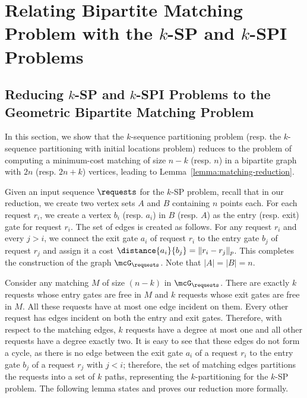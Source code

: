 \section{Relating Bipartite Matching Problem with the \texorpdfstring{$k$}{-}-SP and \texorpdfstring{$k$}{-}-SPI Problems}

\subsection{Reducing \texorpdfstring{$k$}{}-SP and \texorpdfstring{$k$}{}-SPI Problems to the Geometric Bipartite Matching Problem}\label{sec:background}
In this section, we show that the $k$-sequence partitioning problem (resp. the $k$-sequence partitioning with initial locations problem) reduces to the problem of computing a minimum-cost matching of size $n-k$ (resp. $n$) in a bipartite graph with $2n$ (resp. $2n+k$) vertices, leading to Lemma~\ref{lemma:matching-reduction}. 


 Given an input sequence $\requests$ for the $k$-SP problem, recall that in our reduction, we create two vertex sets $A$ and $B$ containing $n$ points each. For each request $r_i$, we create a vertex $b_i$ (resp. $a_i$) in $B$ (resp. $A$) as the entry (resp. exit) gate for request $r_i$. The set of edges is created as follows. For any request $r_i$ and every $j > i$, we connect the exit gate $a_i$ of request $r_i$ to the entry gate $b_j$ of request $r_j$ and assign it a cost $\distance{a_i}{b_j}=\|r_i-r_j\|_p$. 
This completes the construction of the graph $\mcG_\requests$. Note that $|A|=|B|=n$.



Consider any matching $M$ of size $(n-k)$ in $\mcG_\requests$. There are exactly $k$ requests whose entry gates are free in $M$ and $k$ requests whose exit gates are free in $M$. All these requests have at most one edge incident on them. Every other request has edges incident on both the entry and exit gates. Therefore, with respect to the matching edges, $k$ requests have a degree at most one and all other requests have a degree exactly two. It is easy to see that these edges do not form a cycle, as there is no edge between the exit gate $a_i$ of a request $r_i$ to the entry gate $b_j$ of a request $r_j$ with $j<i$; therefore, the set of matching edges partitions the requests into a set of $k$ paths, representing the $k$-partitioning for the $k$-SP problem. The following lemma states and proves our reduction more formally. 

